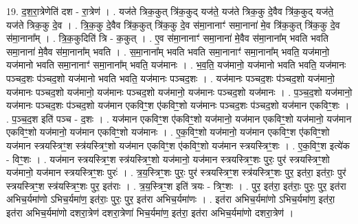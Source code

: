 \documentclass[17pt]{extarticle}
\begin{document}
19. द॒श॒रा॒त्रेणेति॑ दश - रा॒त्रेण॑ । . यज॑ते त्रिक॒कुत् त्रि॑क॒कुद् यज॑ते॒ यज॑ते त्रिक॒कु दे॒वैव त्रि॑क॒कुद् यज॑ते॒ यज॑ते त्रिक॒कु दे॒व । . त्रि॒क॒कु दे॒वैव त्रि॑क॒कुत् त्रि॑क॒कु दे॒व स॑मा॒नानाꣳ॑ समा॒नाना॑ मे॒व त्रि॑क॒कुत् त्रि॑क॒कु दे॒व स॑मा॒नाना᳚म् । . त्रि॒क॒कुदिति॑ त्रि - क॒कुत् । . ए॒व स॑मा॒नानाꣳ॑ समा॒नाना॑ मे॒वैव स॑मा॒नाना᳚म् भवति भवति समा॒नाना॑ मे॒वैव स॑मा॒नाना᳚म् भवति । . स॒मा॒नाना᳚म् भवति भवति समा॒नानाꣳ॑ समा॒नाना᳚म् भवति॒ यज॑मानो॒ यज॑मानो भवति समा॒नानाꣳ॑ समा॒नाना᳚म् भवति॒ यज॑मानः । . भ॒व॒ति॒ यज॑मानो॒ यज॑मानो भवति भवति॒ यज॑मानः पञ्चद॒शः प॑ञ्चद॒शो यज॑मानो भवति भवति॒ यज॑मानः पञ्चद॒शः । . यज॑मानः पञ्चद॒शः प॑ञ्चद॒शो यज॑मानो॒ यज॑मानः पञ्चद॒शो यज॑मानो॒ यज॑मानः पञ्चद॒शो यज॑मानो॒ यज॑मानः पञ्चद॒शो यज॑मानः । . प॒ञ्च॒द॒शो यज॑मानो॒ यज॑मानः पञ्चद॒शः प॑ञ्चद॒शो यज॑मान एकविꣳ॒॒श ए॑कविꣳ॒॒शो यज॑मानः पञ्चद॒शः प॑ञ्चद॒शो यज॑मान एकविꣳ॒॒शः । . प॒ञ्च॒द॒श इति॑ पञ्च - द॒शः । . यज॑मान एकविꣳ॒॒श ए॑कविꣳ॒॒शो यज॑मानो॒ यज॑मान एकविꣳ॒॒शो यज॑मानो॒ यज॑मान एकविꣳ॒॒शो यज॑मानो॒ यज॑मान एकविꣳ॒॒शो यज॑मानः । . ए॒क॒विꣳ॒॒शो यज॑मानो॒ यज॑मान एकविꣳ॒॒श ए॑कविꣳ॒॒शो यज॑मान स्त्रयस्त्रिꣳ॒॒श स्त्र॑यस्त्रिꣳ॒॒शो यज॑मान एकविꣳ॒॒श ए॑कविꣳ॒॒शो यज॑मान स्त्रयस्त्रिꣳ॒॒शः । . ए॒क॒विꣳ॒॒श इत्ये॑क - विꣳ॒॒शः । . यज॑मान स्त्रयस्त्रिꣳ॒॒श स्त्र॑यस्त्रिꣳ॒॒शो यज॑मानो॒ यज॑मान स्त्रयस्त्रिꣳ॒॒शः पुरः॒ पुर॑ स्त्रयस्त्रिꣳ॒॒शो यज॑मानो॒ यज॑मान स्त्रयस्त्रिꣳ॒॒शः पुरः॑ । . त्र॒य॒स्त्रिꣳ॒॒शः पुरः॒ पुर॑ स्त्रयस्त्रिꣳ॒॒श स्त्र॑यस्त्रिꣳ॒॒शः पुर॒ इत॑रा॒ इत॑राः॒ पुर॑ स्त्रयस्त्रिꣳ॒॒श स्त्र॑यस्त्रिꣳ॒॒शः पुर॒ इत॑राः । . त्र॒य॒स्त्रिꣳ॒॒श इति॑ त्रयः - त्रिꣳ॒॒शः । . पुर॒ इत॑रा॒ इत॑राः॒ पुरः॒ पुर॒ इत॑रा अभिच॒र्यमा॑णो ऽभिच॒र्यमा॑ण॒ इत॑राः॒ पुरः॒ पुर॒ इत॑रा अभिच॒र्यमा॑णः । . इत॑रा अभिच॒र्यमा॑णो ऽभिच॒र्यमा॑ण॒ इत॑रा॒ इत॑रा अभिच॒र्यमा॑णो दशरा॒त्रेण॑ दशरा॒त्रेणा॑ भिच॒र्यमा॑ण॒ इत॑रा॒ इत॑रा अभिच॒र्यमा॑णो दशरा॒त्रेण॑ । \newline
\end{document}
